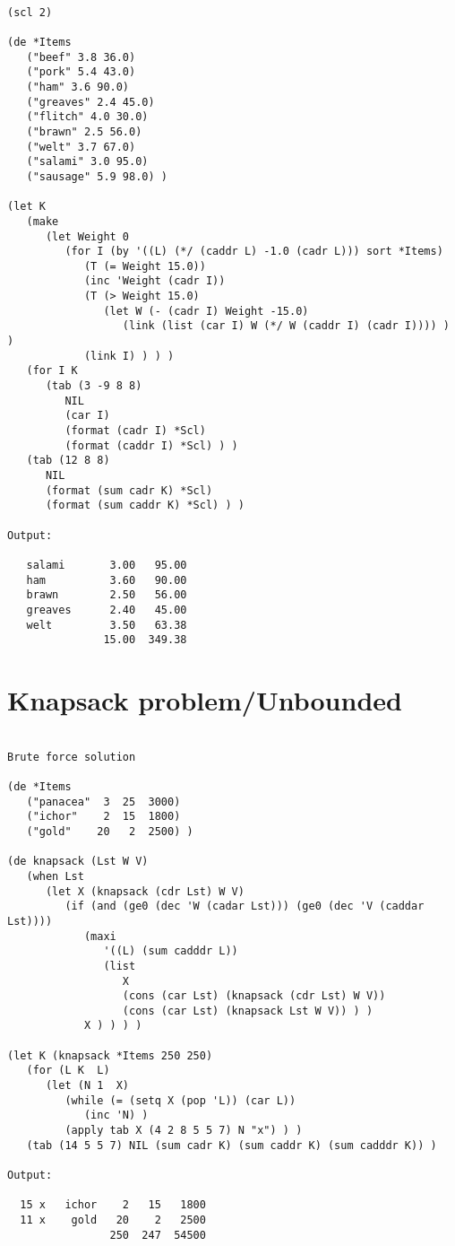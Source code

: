 \begin{verbatim}

(scl 2)

(de *Items
   ("beef" 3.8 36.0)
   ("pork" 5.4 43.0)
   ("ham" 3.6 90.0)
   ("greaves" 2.4 45.0)
   ("flitch" 4.0 30.0)
   ("brawn" 2.5 56.0)
   ("welt" 3.7 67.0)
   ("salami" 3.0 95.0)
   ("sausage" 5.9 98.0) )

(let K
   (make
      (let Weight 0
         (for I (by '((L) (*/ (caddr L) -1.0 (cadr L))) sort *Items)
            (T (= Weight 15.0))
            (inc 'Weight (cadr I))
            (T (> Weight 15.0)
               (let W (- (cadr I) Weight -15.0)
                  (link (list (car I) W (*/ W (caddr I) (cadr I)))) ) )
            (link I) ) ) )
   (for I K
      (tab (3 -9 8 8)
         NIL
         (car I)
         (format (cadr I) *Scl)
         (format (caddr I) *Scl) ) )
   (tab (12 8 8)
      NIL
      (format (sum cadr K) *Scl)
      (format (sum caddr K) *Scl) ) )

Output:

   salami       3.00   95.00
   ham          3.60   90.00
   brawn        2.50   56.00
   greaves      2.40   45.00
   welt         3.50   63.38
               15.00  349.38

\end{verbatim}

\section*{Knapsack problem/Unbounded}

\begin{verbatim}

Brute force solution

(de *Items
   ("panacea"  3  25  3000)
   ("ichor"    2  15  1800)
   ("gold"    20   2  2500) )

(de knapsack (Lst W V)
   (when Lst
      (let X (knapsack (cdr Lst) W V)
         (if (and (ge0 (dec 'W (cadar Lst))) (ge0 (dec 'V (caddar Lst))))
            (maxi
               '((L) (sum cadddr L))
               (list
                  X
                  (cons (car Lst) (knapsack (cdr Lst) W V))
                  (cons (car Lst) (knapsack Lst W V)) ) )
            X ) ) ) )

(let K (knapsack *Items 250 250)
   (for (L K  L)
      (let (N 1  X)
         (while (= (setq X (pop 'L)) (car L))
            (inc 'N) )
         (apply tab X (4 2 8 5 5 7) N "x") ) )
   (tab (14 5 5 7) NIL (sum cadr K) (sum caddr K) (sum cadddr K)) )

Output:

  15 x   ichor    2   15   1800
  11 x    gold   20    2   2500
                250  247  54500

\end{verbatim}

